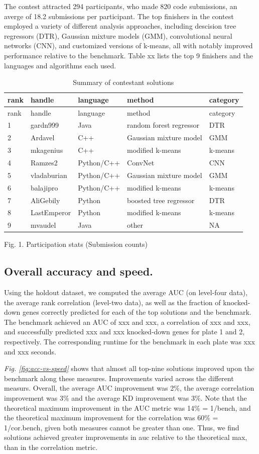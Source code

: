 \documentclass[]{article}
\begin{document}
The contest attracted 294 participants, who made 820 code submissions,
an averge of 18.2 submissions per participant. The top finishers in the
contest employed a variety of different analysis approaches, including
descision tree regressors (DTR), Gaussian mixture models (GMM),
convolutional neural networks (CNN), and customized versions of k-means,
all with notably improved performance relative to the benchmark. Table
xx lists the top 9 finishers and the languages and algorithms each used.

\begin{longtable}[]{@{}lllll@{}}
\caption{Summary of contestant solutions}\tabularnewline
\toprule
rank & handle & language & method & category\tabularnewline
\midrule
\endfirsthead
\toprule
rank & handle & language & method & category\tabularnewline
\midrule
\endhead
1 & gardn999 & Java & random forest regressor & DTR\tabularnewline
2 & Ardavel & C++ & Gaussian mixture model & GMM\tabularnewline
3 & mkagenius & C++ & modified k-means & k-means\tabularnewline
4 & Ramzes2 & Python/C++ & ConvNet & CNN\tabularnewline
5 & vladaburian & Python/C++ & Gaussian mixture model &
GMM\tabularnewline
6 & balajipro & Python/C++ & modified k-means & k-means\tabularnewline
7 & AliGebily & Python & boosted tree regressor & DTR\tabularnewline
8 & LastEmperor & Python & modified k-means & k-means\tabularnewline
9 & mvaudel & Java & other & NA\tabularnewline
\bottomrule
\end{longtable}

Fig. 1. Participation stats (Submission counts)

\hypertarget{overall-accuracy-and-speed.}{%
\subsection{Overall accuracy and
speed.}\label{overall-accuracy-and-speed.}}

Using the holdout dataset, we computed the average AUC (on level-four
data), the average rank correlation (level-two data), as well as the
fraction of knocked-down genes correctly predicted for each of the top
solutions and the benchmark. The benchmark achieved an AUC of xxx and
xxx, a correlation of xxx and xxx, and successfully predicted xxx and
xxx knocked-down genes for plate 1 and 2, respectively. The
corresponding runtime for the benchmark in each plate was xxx and xxx
seconds.

{\it Fig. \ref{fig:acc-vs-speed}} shows that almost all top-nine
solutions improved upon the benchmark along these measures. Improvements
varied across the different measurs. Overall, the average AUC
improvement was 2\%, the average correlation improvement was 3\% and the
average KD improvement was 3\%. Note that the theoretical maximum
improvement in the AUC metric was 14\% = 1/bench, and the theoretical
maximum improvement for the correlation was 60\% = 1/cor.bench, given
both measures cannot be greater than one. Thus, we find solutions
achieved greater improvements in auc relative to the theoretical max,
than in the correlation metric.
\end{document}
